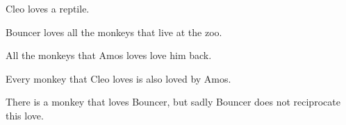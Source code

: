 \begin{practiceproblems}
\begin{earg}
\item Cleo loves a reptile.
\item[] 
\item Bouncer loves all the monkeys that live at the zoo.
\item[] \item All the monkeys that Amos loves love him back.
\item[] 
\item Every monkey that Cleo loves is also loved by Amos.
\item[] 
\item There is a monkey that loves Bouncer, but sadly Bouncer does not reciprocate this love.
\item[] 
\end{earg}


\end{practiceproblems}
